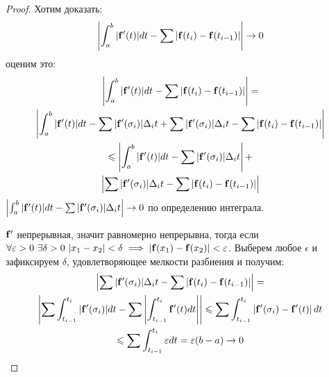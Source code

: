 \documentclass[main]{subfiles}
\begin{document}
\begin{proof}
    Хотим доказать:
    \[\left| \int_a^b |\mathbf{f}'(t)| dt - \sum |\mathbf{f}(t_i) - \mathbf{f}(t_{i-1})|\right| \to 0\]
    оценим это:
    \begin{multline*}
        \left| \int_a^b |\mathbf{f}'(t)| dt - \sum |\mathbf{f}(t_i) - \mathbf{f}(t_{i-1})|\right| = \\
        \left| \int_a^b |\mathbf{f}'(t)| dt - \sum |\mathbf{f}'(\sigma_i)| \Delta_i t  + \sum |\mathbf{f}' (\sigma_i)| \Delta_i t - \sum |\mathbf{f}(t_i) - \mathbf{f}(t_{i-1})| \right| \\
        \leqslant \left| \int_a^b |\mathbf{f}'(t)| dt - \sum |\mathbf{f}'(\sigma_i)| \Delta_i t \right|  +\\
        \left| \sum |\mathbf{f}' (\sigma_i)| \Delta_i t - \sum |\mathbf{f}(t_i) - \mathbf{f}(t_{i-1})| \right|
    \end{multline*}
    $\left| \int_a^b |\mathbf{f}'(t)| dt - \sum |\mathbf{f}'(\sigma_i)| \Delta_i t \right| \to 0$ по определению интеграла.

    $\mathbf{f}'$ непрерывная, значит равномерно непрерывна, тогда если
    $\forall \varepsilon > 0\  \exists \delta > 0\  |x_1 - x_2| < \delta \implies |\mathbf{f}(x_1) - \mathbf{f}(x_2)| < \varepsilon$.
    Выберем любое $\epsilon$ и зафиксируем $\delta$, удовлетворяющее мелкости разбиения и получим:
    \begin{multline*}
        \left| \sum |\mathbf{f}' (\sigma_i)| \Delta_i t - \sum |\mathbf{f}(t_i) - \mathbf{f}(t_{i-1})| \right| =\\
        \left|\sum \int_{t_{i-1}}^{t_i} |\mathbf{f}'(\sigma_i)|dt -  \sum \left|\int_{t_{i-1}}^{t_i} \mathbf{f}'(t)dt\right|\right|
        \leqslant \sum \int_{t_{i-1}}^{t_i} \left|\mathbf{f}'(\sigma_i) - \mathbf{f}'(t) \right|dt \\
        \leqslant \sum \int_{t_{i-1}}^{t_i} \varepsilon dt = \varepsilon (b-a) \to 0
    \end{multline*}
\end{proof}
\end{document}
